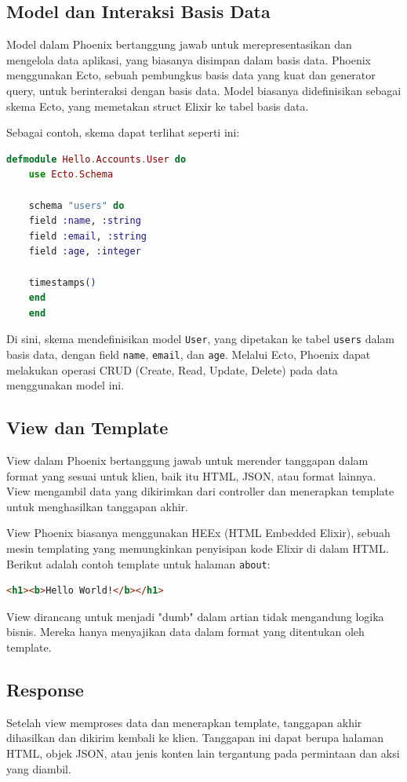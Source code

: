 \subsection{Model dan Interaksi Basis Data}
Model dalam Phoenix bertanggung jawab untuk merepresentasikan dan mengelola data aplikasi, yang biasanya disimpan dalam basis data. Phoenix menggunakan Ecto, sebuah pembungkus basis data yang kuat dan generator query, untuk berinteraksi dengan basis data. Model biasanya didefinisikan sebagai skema Ecto, yang memetakan struct Elixir ke tabel basis data.

Sebagai contoh, skema dapat terlihat seperti ini:
\begin{lstlisting}[language=Elixir]
	defmodule Hello.Accounts.User do
	use Ecto.Schema
	
	schema "users" do
	field :name, :string
	field :email, :string
	field :age, :integer
	
	timestamps()
	end
	end
\end{lstlisting}

Di sini, skema mendefinisikan model \texttt{User}, yang dipetakan ke tabel \texttt{users} dalam basis data, dengan field \texttt{name}, \texttt{email}, dan \texttt{age}. Melalui Ecto, Phoenix dapat melakukan operasi CRUD (Create, Read, Update, Delete) pada data menggunakan model ini.

\subsection{View dan Template}
View dalam Phoenix bertanggung jawab untuk merender tanggapan dalam format yang sesuai untuk klien, baik itu HTML, JSON, atau format lainnya. View mengambil data yang dikirimkan dari controller dan menerapkan template untuk menghasilkan tanggapan akhir.

View Phoenix biasanya menggunakan HEEx (HTML Embedded Elixir), sebuah mesin templating yang memungkinkan penyisipan kode Elixir di dalam HTML. Berikut adalah contoh template untuk halaman \texttt{about}:

\begin{lstlisting}[language=html]
	<h1><b>Hello World!</b></h1>
\end{lstlisting}

View dirancang untuk menjadi "dumb" dalam artian tidak mengandung logika bisnis. Mereka hanya menyajikan data dalam format yang ditentukan oleh template.

\subsection{Response}
Setelah view memproses data dan menerapkan template, tanggapan akhir dihasilkan dan dikirim kembali ke klien. Tanggapan ini dapat berupa halaman HTML, objek JSON, atau jenis konten lain tergantung pada permintaan dan aksi yang diambil.

